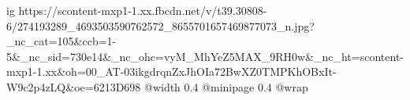  
 
 
 
 

\ifcmt
  ig https://scontent-mxp1-1.xx.fbcdn.net/v/t39.30808-6/274193289_4693503590762572_8655701657469877073_n.jpg?_nc_cat=105&ccb=1-5&_nc_sid=730e14&_nc_ohc=vyM_MhYeZ5MAX_9RH0w&_nc_ht=scontent-mxp1-1.xx&oh=00_AT-03ikgdrqnZxJhOIa72BwXZ0TMPKhOBxIt-W9c2p4zLQ&oe=6213D698
  @width 0.4
  @minipage 0.4
  @wrap \parpic[r]
\fi
